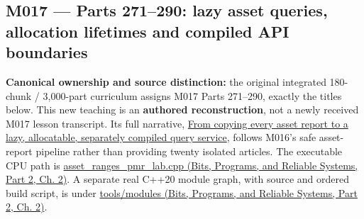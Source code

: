 \subsection{M017 --- Parts 271--290: lazy asset queries, allocation lifetimes and compiled API boundaries}\label{appendix-fd090d982a15-m017-parts-271290-lazy-asset-queries-allocation-lifetimes-and-compiled-api-boundaries}

\hypertarget{appendix-fd090d982a15-m017-parts-271290-lazy-asset-queries-allocation-lifetimes-and-compiled-api-boundaries}{}

\textbf{Canonical ownership and source distinction:} the original integrated 180-chunk / 3,000-part curriculum assigns M017 Parts 271--290, exactly the titles below. This new teaching is an \textbf{authored reconstruction}, not a newly received M017 lesson transcript. Its full narrative, \hyperref[01-foundations-i-ch006-from-copying-every-asset-report-to-a-lazy-allocatable-separately-compiled-query-service]{From copying every asset report to a lazy, allocatable, separately compiled query service}, follows M016's safe asset-report pipeline rather than providing twenty isolated articles. The executable CPU path is \href{../01-Bits-Programs-and-Reliable-Systems-P02/main.pdf\#source-file-a1c76c44bc377537c732f5c4}{asset\_ranges\_pmr\_lab.cpp (Bits, Programs, and Reliable Systems, Part 2, Ch. 2)}. A separate real C++20 module graph, with source and ordered build script, is under \href{../01-Bits-Programs-and-Reliable-Systems-P02/main.pdf\#source-file-e1b7c3e4f52da0e7c9c36a41}{tools/modules (Bits, Programs, and Reliable Systems, Part 2, Ch. 2)}.


